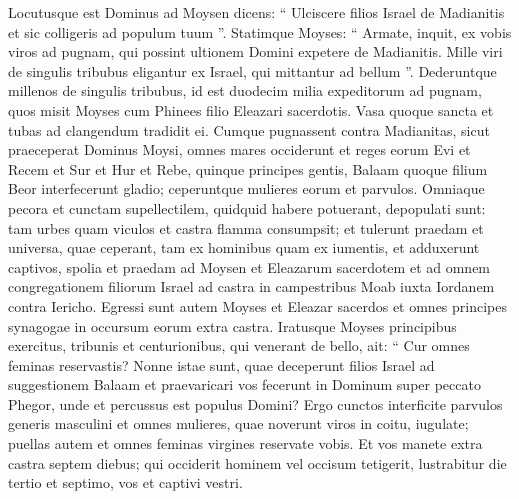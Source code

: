 \begin{biblechapter}
\begin{biblechapter}
\begin{biblechapter}
\begin{biblechapter}
\begin{biblechapter}
\begin{biblechapter}
\begin{biblechapter}
\begin{biblechapter}
\begin{biblechapter}
\begin{biblechapter}
\begin{biblechapter}
\begin{biblechapter}
\begin{biblechapter}
\begin{biblechapter}
\begin{biblechapter}
\begin{biblechapter}
\begin{biblechapter}
\begin{biblechapter}
\begin{biblechapter}
\begin{biblechapter}
\begin{biblechapter}
\begin{biblechapter}
\begin{biblechapter}
\begin{biblechapter}
\begin{biblechapter}
\begin{biblechapter}
\begin{biblechapter}
\begin{biblechapter}
\begin{biblechapter}
\begin{biblechapter}
\begin{biblechapter}
\verse Locutusque est Dominus ad Moysen dicens: 
\verse “ Ulciscere filios Israel de Madianitis et sic colligeris ad populum tuum ”. 
\verse Statimque Moyses: “ Armate, inquit, ex vobis viros ad pugnam, qui possint ultionem Domini expetere de Madianitis. 
\verse Mille viri de singulis tribubus eligantur ex Israel, qui mittantur ad bellum ”. 
\verse Dederuntque millenos de singulis tribubus, id est duodecim milia expeditorum ad pugnam, 
\verse quos misit Moyses cum Phinees filio Eleazari sacerdotis. Vasa quoque sancta et tubas ad clangendum tradidit ei.
 \verse Cumque pugnassent contra Madianitas, sicut praeceperat Dominus Moysi, omnes mares occiderunt 
\verse et reges eorum Evi et Recem et Sur et Hur et Rebe, quinque principes gentis, Balaam quoque filium Beor interfecerunt gladio; 
\verse ceperuntque mulieres eorum et parvulos. Omniaque pecora et cunctam supellectilem, quidquid habere potuerant, depopulati sunt: 
\verse tam urbes quam viculos et castra flamma consumpsit; 
\verse et tulerunt praedam et universa, quae ceperant, tam ex hominibus quam ex iumentis, 
\verse et adduxerunt captivos, spolia et praedam ad Moysen et Eleazarum sacerdotem et ad omnem congregationem filiorum Israel ad castra in campestribus Moab iuxta Iordanem contra Iericho.
 \verse Egressi sunt autem Moyses et Eleazar sacerdos et omnes principes synagogae in occursum eorum extra castra. 
\verse Iratusque Moyses principibus exercitus, tribunis et centurionibus, qui venerant de bello, 
\verse ait: “ Cur omnes feminas reservastis? 
\verse Nonne istae sunt, quae deceperunt filios Israel ad suggestionem Balaam et praevaricari vos fecerunt in Dominum super peccato Phegor, unde et percussus est populus Domini? 
\verse Ergo cunctos interficite parvulos generis masculini et omnes mulieres, quae noverunt viros in coitu, iugulate; 
\verse puellas autem et omnes feminas virgines reservate vobis. 
\verse Et vos manete extra castra septem diebus; qui occiderit hominem vel occisum tetigerit, lustrabitur die tertio et septimo, vos et captivi vestri. 

\end{biblechapter}
\end{biblechapter}
\end{biblechapter}
\end{biblechapter}
\end{biblechapter}
\end{biblechapter}
\end{biblechapter}
\end{biblechapter}
\end{biblechapter}
\end{biblechapter}
\end{biblechapter}
\end{biblechapter}
\end{biblechapter}
\end{biblechapter}
\end{biblechapter}
\end{biblechapter}
\end{biblechapter}
\end{biblechapter}
\end{biblechapter}
\end{biblechapter}
\end{biblechapter}
\end{biblechapter}
\end{biblechapter}
\end{biblechapter}
\end{biblechapter}
\end{biblechapter}
\end{biblechapter}
\end{biblechapter}
\end{biblechapter}
\end{biblechapter}
\end{biblechapter}
